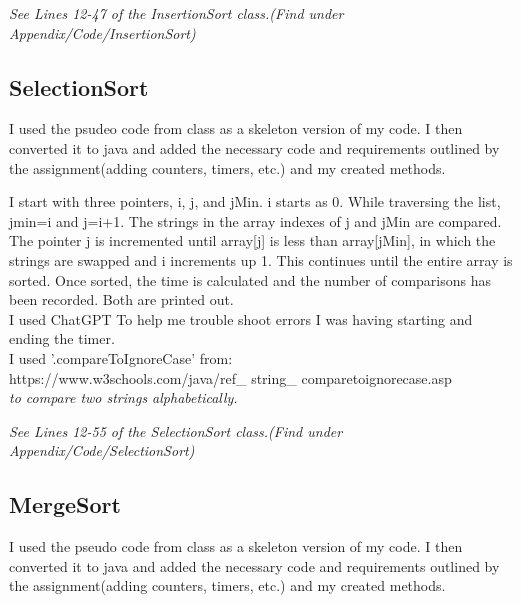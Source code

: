 \documentclass[10pt]{article}
\begin{document}
\emph{\normalfont 
See Lines 12-47 of the InsertionSort class.(Find under Appendix/Code/InsertionSort)}

\subsection{SelectionSort}
I used the psudeo code from class as a skeleton version of my code. I then converted it to java and added the necessary code and requirements outlined by the assignment(adding counters, timers, etc.) and my created methods.

I start with three pointers, i, j, and jMin. i starts as 0.
While traversing the list, jmin=i and j=i+1. The strings in the array indexes of j and jMin are compared. The pointer j is incremented until array[j] is less than array[jMin], in which the strings are swapped and i increments up 1. This continues until the entire array is sorted. Once sorted, the time is calculated and the number of comparisons has been recorded. Both are printed out.
\\
\newline
I used ChatGPT To help me trouble shoot errors I was having starting and ending the timer.
\\
\newline
I used '.compareToIgnoreCase' from:
\\
https://www.w3schools.com/java/ref_ string_ comparetoignorecase.asp
\\
\emph{\normalfont to compare two strings alphabetically.}
\newline

\emph{\normalfont 
See Lines 12-55 of the SelectionSort class.(Find under Appendix/Code/SelectionSort)}

\subsection{MergeSort}
I used the pseudo code from class as a skeleton version of my code. I then converted it to java and added the necessary code and requirements outlined by the assignment(adding counters, timers, etc.) and my created methods.
\end{document}
